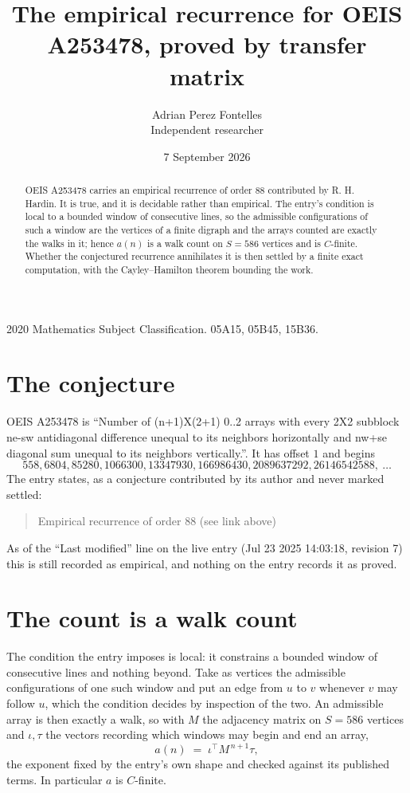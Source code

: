 \documentclass[11pt,a4paper]{article}
\title{The empirical recurrence for OEIS A253478, proved by transfer matrix}
\author{Adrian Perez Fontelles\\ \small Independent researcher}
\date{7 September 2026}
\theoremstyle{plain}
\theoremstyle{definition}
\begin{document}
\maketitle

\begin{abstract}
OEIS A253478 carries an empirical recurrence of order $88$ contributed by R. H. Hardin. It is
true, and it is decidable rather than empirical. The entry's condition is local to a bounded window of consecutive lines, so
the admissible configurations of such a window are the vertices of a finite digraph and the
arrays counted are exactly the walks in it; hence $a(n)$ is a walk count on $S=586$ vertices
and is $C$-finite. Whether the conjectured recurrence annihilates it is then settled by a
finite exact computation, with the Cayley--Hamilton theorem bounding the work.
\end{abstract}

\noindent\small 2020 Mathematics Subject Classification. 05A15, 05B45, 15B36.\normalsize

\section{The conjecture}

OEIS A253478 is ``Number of (n+1)X(2+1) 0..2 arrays with every 2X2 subblock ne-sw antidiagonal difference unequal to its neighbors horizontally and nw+se diagonal sum unequal to its neighbors vertically.''. It has offset $1$ and begins
\[
558, 6804, 85280, 1066300, 13347930, 166986430, 2089637292, 26146542588,\ \dots
\]
The entry states, as a conjecture contributed by its author and never marked settled:
\begin{quote}
Empirical recurrence of order 88 (see link above)
\end{quote}
As of the ``Last modified'' line on the live entry (Jul 23 2025 14:03:18, revision 7) this is still
recorded as empirical, and nothing on the entry records it as proved.

\section{The count is a walk count}

The condition the entry imposes is local: it constrains a bounded window of consecutive lines and nothing beyond. Take as
vertices the admissible configurations of one such window and put an edge from $u$ to $v$
whenever $v$ may follow $u$, which the condition decides by inspection of the two. An
admissible array is then exactly a walk, so with $M$ the adjacency matrix on $S=586$ vertices
and $\iota,\tau$ the vectors recording which windows may begin and end an array,
\[
a(n)\;=\;\iota^{\!\top}M^{\,n+1}\tau ,
\]
the exponent fixed by the entry's own shape and checked against its published terms. In
particular $a$ is $C$-finite.
\end{document}
